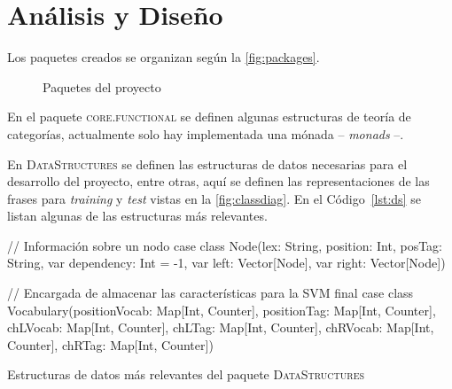\section{Análisis y Diseño}
\label{sec:design}

Los paquetes creados se organizan según la \autoref{fig:packages}.
\begin{figure}[ht]

  \caption{Paquetes del proyecto}
  \label{fig:packages}
\end{figure}

En el paquete \textsc{core.functional} se definen algunas estructuras de teoría
de categorías, actualmente solo hay implementada una mónada -- \emph{monads} --.

En \textsc{DataStructures} se definen las estructuras de datos necesarias para
el desarrollo del proyecto, entre otras, aquí se definen las representaciones de
las frases para \emph{training} y \emph{test} vistas en la
\autoref{fig:classdiag}. En el Código~\ref{lst:ds} se listan algunas de las
estructuras más relevantes.
\begin{listing}[ht]
  \begin{scalacode}
    // Información sobre un nodo
    case class Node(lex: String,
                    position: Int,
                    posTag: String,
                    var dependency: Int = -1,
                    var left: Vector[Node],
                    var right: Vector[Node])

    // Encargada de almacenar las características para la SVM
    final case class Vocabulary(positionVocab: Map[Int, Counter],
                                positionTag: Map[Int, Counter],
                                chLVocab: Map[Int, Counter],
                                chLTag: Map[Int, Counter],
                                chRVocab: Map[Int, Counter],
                                chRTag: Map[Int, Counter])
  \end{scalacode}
  \caption{\footnotesize Estructuras de datos más relevantes del paquete
    \textsc{DataStructures}}
  \label{lst:ds}
\end{listing}

